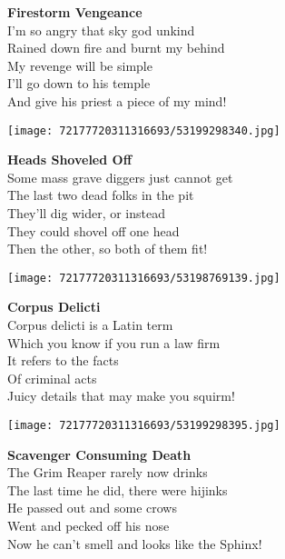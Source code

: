 \documentclass[10pt,letterpaper]{article}
\begin{document}
\begin{center}
\textbf{Firestorm Vengeance}\\
\vskip 0.2in
I'm so angry that sky god unkind\\
Rained down fire and burnt my behind\\
My revenge will be simple\\
I'll go down to his temple\\
And give his priest a piece of my mind!\\
\end{center}
\pagebreak

\begin{center}
\texttt{[image: 72177720311316693/53199298340.jpg]}
\end{center}

\begin{center}
\textbf{Heads Shoveled Off}\\
\vskip 0.2in
Some mass grave diggers just cannot get\\
The last two dead folks in the pit\\
They'll dig wider, or instead\\
They could shovel off one head\\
Then the other, so both of them fit!\\
\end{center}
\pagebreak

\begin{center}\texttt{[image: 72177720311316693/53198769139.jpg]}
\end{center}
\begin{center}
\textbf{Corpus Delicti}\\
\vskip 0.2in
Corpus delicti is a Latin term\\
Which you know if you run a law firm\\
It refers to the facts\\
Of criminal acts\\
Juicy details that may make you squirm!\\
\end{center}
\pagebreak

\begin{center}\texttt{[image: 72177720311316693/53199298395.jpg]}
\end{center}
\begin{center}
\textbf{Scavenger Consuming Death}\\
\vskip 0.2in
The Grim Reaper rarely now drinks\\
The last time he did, there were hijinks\\
He passed out and some crows\\
Went and pecked off his nose\\
Now he can't smell and looks like the Sphinx!\\
\end{center}
\pagebreak
\end{document}
